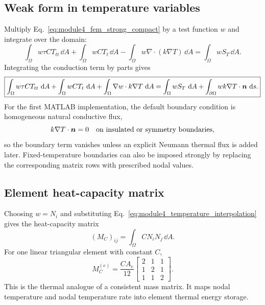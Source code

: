 \documentclass[11pt]{article}
\begin{document}
\subsection{Weak form in temperature variables}
Multiply Eq.~\eqref{eq:module4_fem_strong_compact} by a test function \(w\) and integrate over the domain:
\begin{equation}
    \int_\Omega w\tau C T_{tt}\,\dd A
    +\int_\Omega w C T_t\,\dd A
    -\int_\Omega w\nabla\cdot(k\nabla T)\,\dd A
    =\int_\Omega wS_T\,\dd A.
\end{equation}
Integrating the conduction term by parts gives
\begin{equation}
    \boxed{
    \int_\Omega w\tau C T_{tt}\,\mathop{}\!\mathrm{d} A
    +\int_\Omega w C T_t\,\mathop{}\!\mathrm{d} A
    +\int_\Omega \nabla w\cdot k\nabla T\,\mathop{}\!\mathrm{d} A
    =\int_\Omega wS_T\,\mathop{}\!\mathrm{d} A
    +\int_{\partial\Omega} w k\nabla T\cdot\bm{n}\,\mathop{}\!\mathrm{d} s.}
    \label{eq:module4_fem_temperature_weak}
\end{equation}
For the first MATLAB implementation, the default boundary condition is homogeneous natural conductive flux,
\begin{equation}
    k\nabla T\cdot\bm{n}=0 \quad \text{on insulated or symmetry boundaries},
\end{equation}
so the boundary term vanishes unless an explicit Neumann thermal flux is added later. Fixed-temperature boundaries can also be imposed strongly by replacing the corresponding matrix rows with prescribed nodal values.

\subsection{Element heat-capacity matrix}
Choosing \(w=N_i\) and substituting Eq.~\eqref{eq:module4_temperature_interpolation} gives the heat-capacity matrix
\begin{equation}
    (M_C)_{ij}=\int_\Omega C N_iN_j\,\dd A.
\end{equation}
For one linear triangular element with constant \(C\),
\begin{equation}
    \boxed{
    M_C^{(e)}=\frac{C A_e}{12}
    \begin{bmatrix}
    2&1&1\\
    1&2&1\\
    1&1&2
    \end{bmatrix}.}
    \label{eq:module4_element_heat_capacity_matrix}
\end{equation}
This is the thermal analogue of a consistent mass matrix. It maps nodal temperature and nodal temperature rate into element thermal energy storage.
\end{document}
